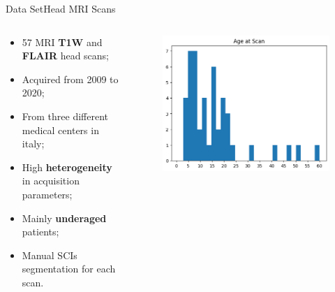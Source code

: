 \documentclass[]{standalone}
\begin{document}
	\begin{frame}{Data Set}{Head MRI Scans}
	\vspace{-25pt}
	\begin{columns}
		\begin{column}{0.5\textwidth}
		\begin{exampleblock}{}
		\begin{itemize}
		\small
			\item 57 MRI \textbf{T1W} and \textbf{FLAIR} head scans;
			\item Acquired from 2009 to 2020;
			\item From three different medical centers in italy;
			\item High \textbf{heterogeneity} in acquisition parameters;
			\item Mainly \textbf{underaged} patients;
			\item Manual SCIs segmentation for each scan.
		\end{itemize}
		\end{exampleblock}
		\end{column}
		\begin{column}{0.52\textwidth}
		\begin{figure}[h!]
			\centering
			\includegraphics[scale = 0.4]{./IMG/Age.png}
		\end{figure}
		\end{column}
	\end{columns}
	\end{frame}
\end{document}
